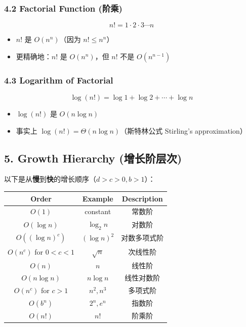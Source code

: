 \documentclass[10pt,a4paper,openany]{ctexbook}
\theoremstyle{definition}
\theoremstyle{remark}
\begin{document}
\subsubsection{4.2 Factorial Function (阶乘)}

\[
n! = 1 \cdot 2 \cdot 3 \cdots n
\]

\begin{itemize}
\item $n!$ 是 $O(n^n)$（因为 $n! \leq n^n$）
\item 更精确地：$n!$ 是 $O(n^n)$，但 $n!$ 不是 $O(n^{n-1})$

\end{itemize}

\subsubsection{4.3 Logarithm of Factorial}

\[
\log(n!) = \log 1 + \log 2 + \cdots + \log n
\]

\begin{itemize}
\item $\log(n!)$ 是 $O(n \log n)$
\item 事实上 $\log(n!) = \Theta(n \log n)$（斯特林公式 Stirling's approximation）

\end{itemize}

\vspace{-2pt}

\subsection{5. Growth Hierarchy (增长阶层次)}

以下是从\textbf{慢}到\textbf{快}的增长顺序（$d > c > 0, b > 1$）：
\begin{center}
\begin{tabular}{ccc}
\hline
Order & Example & Description \\ \hline
$O(1)$ & constant & 常数阶 \\
$O(\log n)$ & $\log_2 n$ & 对数阶 \\
$O((\log n)^c)$ & $(\log n)^2$ & 对数多项式阶 \\
$O(n^c)$ for $0<c<1$ & $\sqrt{n}$ & 次线性阶 \\
$O(n)$ & $n$ & 线性阶 \\
$O(n \log n)$ & $n \log n$ & 线性对数阶 \\
$O(n^c)$ for $c>1$ & $n^2, n^3$ & 多项式阶 \\
$O(b^n)$ & $2^n, e^n$ & 指数阶 \\
$O(n!)$ & $n!$ & 阶乘阶 \\
\hline
\end{tabular}

\end{center}
\end{document}
